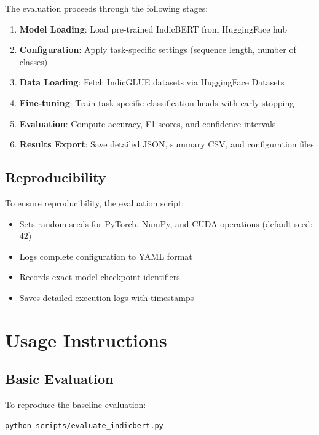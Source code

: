The evaluation proceeds through the following stages:

\begin{enumerate}
    \item \textbf{Model Loading}: Load pre-trained IndicBERT from HuggingFace hub
    \item \textbf{Configuration}: Apply task-specific settings (sequence length, number of classes)
    \item \textbf{Data Loading}: Fetch IndicGLUE datasets via HuggingFace Datasets
    \item \textbf{Fine-tuning}: Train task-specific classification heads with early stopping
    \item \textbf{Evaluation}: Compute accuracy, F1 scores, and confidence intervals
    \item \textbf{Results Export}: Save detailed JSON, summary CSV, and configuration files
\end{enumerate}

\subsection{Reproducibility}

To ensure reproducibility, the evaluation script:
\begin{itemize}
    \item Sets random seeds for PyTorch, NumPy, and CUDA operations (default seed: 42)
    \item Logs complete configuration to YAML format
    \item Records exact model checkpoint identifiers
    \item Saves detailed execution logs with timestamps
\end{itemize}

\section{Usage Instructions}
\label{sec:usage}

\subsection{Basic Evaluation}

To reproduce the baseline evaluation:

\begin{verbatim}
python scripts/evaluate_indicbert.py
\end{verbatim}

